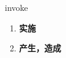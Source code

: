 
\begin{frame}
{\huge invoke}
\begin{center}
\begin{enumerate}\Large
  \item \textbf{实施}
  \item \textbf{产生，造成}
\end{enumerate}
\end{center}
\end{frame}
